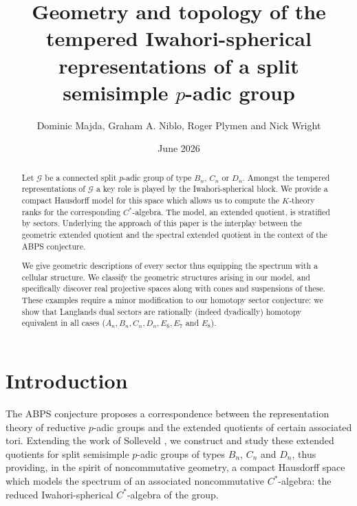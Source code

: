 \documentclass[11pt,a4paper]{article}
\title{Geometry and topology of the tempered Iwahori-spherical representations of a split semisimple $p$-adic group}
\author{Dominic Majda, Graham A. Niblo, Roger Plymen and Nick Wright}
\date{June 2026}
\def\G{\mathcal{G}}
\begin{document}
\maketitle

\begin{abstract}
Let $\G$ be a connected split $p$-adic group of type $B_n$, $C_n$ or $D_n$. Amongst the tempered representations of $\G$ a key role is played by the Iwahori-spherical block. We provide a compact Hausdorff model for this space which allows us to compute the $K$-theory ranks for the corresponding $C^*$-algebra. 
The model, an extended quotient, is stratified by sectors.
Underlying the approach of this paper is the interplay between the geometric extended quotient and the spectral extended quotient in the context of the ABPS conjecture.



 We give geometric descriptions of every sector thus equipping the spectrum with a cellular structure. We classify the geometric structures arising in our model, and specifically discover real projective spaces along with cones and suspensions of these. These examples require a minor modification to our homotopy sector conjecture: we show that Langlands dual sectors are rationally (indeed dyadically) homotopy equivalent in all cases ($A_n, B_n, C_n, D_n, E_6, E_7$ and $E_8$). 





\end{abstract}

\tableofcontents

\section{Introduction}



The ABPS conjecture \cite{ABPS-smooth-dual} proposes a correspondence between the representation theory of reductive $p$-adic groups and the extended quotients of certain associated tori.  Extending the work of Solleveld \cite{Sol}, we construct and study these extended quotients for split semisimple $p$-adic groups of types $B_n$, $C_n$ and $D_n$, thus providing, in the spirit of noncommutative geometry, a compact Hausdorff space which models the spectrum of an associated noncommutative $C^*$-algebra: the reduced Iwahori-spherical $C^*$-algebra of the group.
\end{document}
